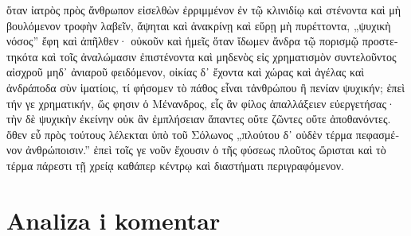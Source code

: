 
\medskip


{\large

\begin{greek}

\noindent ὅταν ἰατρὸς πρὸς ἄνθρωπον εἰσελθὼν ἐρριμμένον ἐν τῷ κλινιδίῳ καὶ στένοντα καὶ μὴ βουλόμενον τροφὴν λαβεῖν, ἅψηται καὶ ἀνακρίνῃ καὶ εὕρῃ μὴ πυρέττοντα, „ψυχικὴ νόσος” ἔφη καὶ ἀπῆλθεν· οὐκοῦν καὶ ἡμεῖς ὅταν ἴδωμεν ἄνδρα τῷ πορισμῷ προστετηκότα καὶ τοῖς ἀναλώμασιν ἐπιστένοντα καὶ μηδενὸς εἰς χρηματισμὸν συντελοῦντος αἰσχροῦ μηδ᾽ ἀνιαροῦ φειδόμενον, οἰκίας δ᾽ ἔχοντα καὶ χώρας καὶ ἀγέλας καὶ ἀνδράποδα σὺν ἱματίοις, τί φήσομεν τὸ πάθος εἶναι τἀνθρώπου ἢ πενίαν ψυχικήν; ἐπεὶ τήν γε χρηματικήν, ὥς φησιν ὁ Μένανδρος, εἷς ἂν φίλος ἀπαλλάξειεν εὐεργετήσας· τὴν δὲ ψυχικὴν ἐκείνην οὐκ ἂν ἐμπλήσειαν ἅπαντες οὔτε ζῶντες οὔτε ἀποθανόντες. ὅθεν εὖ πρὸς τούτους λέλεκται ὑπὸ τοῦ Σόλωνος „πλούτου δ᾽ οὐδὲν τέρμα πεφασμένον ἀνθρώποισιν.” ἐπεὶ τοῖς γε νοῦν ἔχουσιν ὁ τῆς φύσεως πλοῦτος ὥρισται καὶ τὸ τέρμα πάρεστι τῇ χρείᾳ καθάπερ κέντρῳ καὶ διαστήματι περιγραφόμενον.

\end{greek}

}


\section*{Analiza i komentar}


